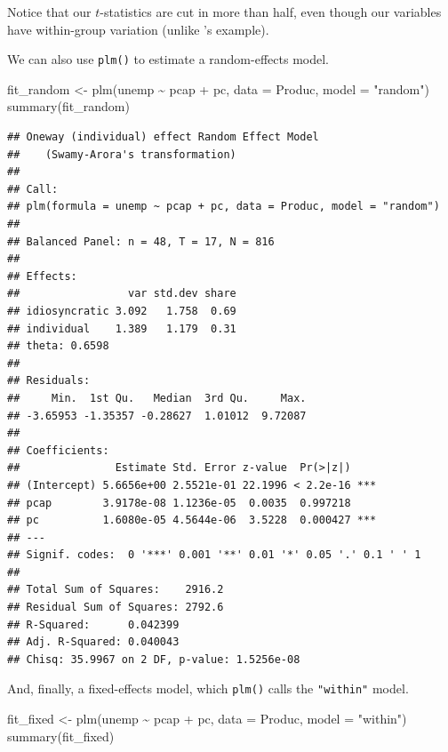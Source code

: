 \documentclass[
  12pt,
  oneside,openany]{book}
\newenvironment{Shaded}{\begin{snugshade}}{\end{snugshade}}
\newcommand{\AttributeTok}[1]{\textcolor[rgb]{0.77,0.63,0.00}{#1}}
\newcommand{\FunctionTok}[1]{\textcolor[rgb]{0.00,0.00,0.00}{#1}}
\newcommand{\NormalTok}[1]{#1}
\newcommand{\OtherTok}[1]{\textcolor[rgb]{0.56,0.35,0.01}{#1}}
\newcommand{\SpecialCharTok}[1]{\textcolor[rgb]{0.00,0.00,0.00}{#1}}
\newcommand{\StringTok}[1]{\textcolor[rgb]{0.31,0.60,0.02}{#1}}
\begin{document}
Notice that our \(t\)-statistics are cut in more than half, even though our variables have within-group variation (unlike \citet{Moulton:1990bl}'s example).

We can also use \texttt{plm()} to estimate a random-effects model.

\begin{Shaded}
\begin{Highlighting}[]
\NormalTok{fit\_random }\OtherTok{\textless{}{-}} \FunctionTok{plm}\NormalTok{(unemp }\SpecialCharTok{\textasciitilde{}}\NormalTok{ pcap }\SpecialCharTok{+}\NormalTok{ pc,}
                  \AttributeTok{data =}\NormalTok{ Produc,}
                  \AttributeTok{model =} \StringTok{"random"}\NormalTok{)}
\FunctionTok{summary}\NormalTok{(fit\_random)}
\end{Highlighting}
\end{Shaded}

\begin{verbatim}
## Oneway (individual) effect Random Effect Model 
##    (Swamy-Arora's transformation)
## 
## Call:
## plm(formula = unemp ~ pcap + pc, data = Produc, model = "random")
## 
## Balanced Panel: n = 48, T = 17, N = 816
## 
## Effects:
##                 var std.dev share
## idiosyncratic 3.092   1.758  0.69
## individual    1.389   1.179  0.31
## theta: 0.6598
## 
## Residuals:
##     Min.  1st Qu.   Median  3rd Qu.     Max. 
## -3.65953 -1.35357 -0.28627  1.01012  9.72087 
## 
## Coefficients:
##               Estimate Std. Error z-value  Pr(>|z|)    
## (Intercept) 5.6656e+00 2.5521e-01 22.1996 < 2.2e-16 ***
## pcap        3.9178e-08 1.1236e-05  0.0035  0.997218    
## pc          1.6080e-05 4.5644e-06  3.5228  0.000427 ***
## ---
## Signif. codes:  0 '***' 0.001 '**' 0.01 '*' 0.05 '.' 0.1 ' ' 1
## 
## Total Sum of Squares:    2916.2
## Residual Sum of Squares: 2792.6
## R-Squared:      0.042399
## Adj. R-Squared: 0.040043
## Chisq: 35.9967 on 2 DF, p-value: 1.5256e-08
\end{verbatim}

And, finally, a fixed-effects model, which \texttt{plm()} calls the \texttt{"within"} model.

\begin{Shaded}
\begin{Highlighting}[]
\NormalTok{fit\_fixed }\OtherTok{\textless{}{-}} \FunctionTok{plm}\NormalTok{(unemp }\SpecialCharTok{\textasciitilde{}}\NormalTok{ pcap }\SpecialCharTok{+}\NormalTok{ pc,}
                 \AttributeTok{data =}\NormalTok{ Produc,}
                 \AttributeTok{model =} \StringTok{"within"}\NormalTok{)}
\FunctionTok{summary}\NormalTok{(fit\_fixed)}
\end{Highlighting}
\end{Shaded}
\end{document}
